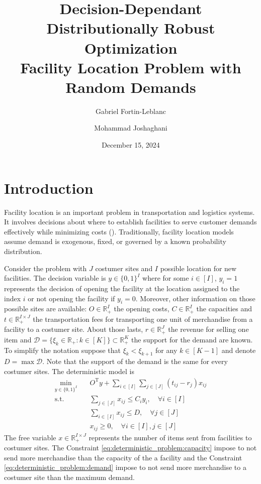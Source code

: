 \documentclass[12pt, letterpaper]{article}
\title{
	Decision-Dependant Distributionally Robust Optimization \\
	\large Facility Location Problem with Random Demands
}
\author[1]{Gabriel Fortin-Leblanc}
\author[2]{Mohammad Joshaghani}
\affil[1]{Université de Montréal}
\affil[2]{Université du Québec à Montréal}
\date{December 15, 2024}
\newcommand{\R}{\mathbb{R}}
\newcommand{\T}{\mathrm{T}}
\newcommand{\Dcal}{\mathcal{D}}
\begin{document}
	\maketitle
	\tableofcontents
	\newpage
	
	\section*{Introduction}
	Facility location is an important problem in transportation and logistics systems. It involves decisions about where to establish facilities to serve customer demands effectively while minimizing costs (\cite{cornuejols1983uncapicitated}). Traditionally, facility location models assume demand is exogenous, fixed, or governed by a known probability distribution.
	
	Consider the problem with $J$ costumer sites and $I$ possible location for new facilities. The decision variable is $y \in \{0, 1\}^I$ where for some $i \in [I]$, $y_i = 1$ represents the decision of opening the facility at the location assigned to the index $i$ or not opening the facility if $y_i = 0$. Moreover, other information on those possible sites are available: $O \in \R_+^I$ the opening costs, $C \in \R_+^I$ the capacities and $t \in \R_+^{I \times J}$ the transportation fees for transporting one unit of merchandise from a facility to a costumer site. About those lasts, $r \in \R_+^J$ the revenue for selling one item and $\Dcal = \{\xi_k \in \R_+: k \in [K]\} \subset \R_+^K$ the support for the demand are known. To simplify the notation suppose that $\xi_k < \xi_{k+1}$ for any $k \in [K-1]$ and denote $D = \max \Dcal$. Note that the support of the demand is the same for every costumer sites. The deterministic model is
	\begin{subequations} \label{eq:deterministic_problem}
		\begin{align}
			\min_{y \in \{0, 1\}^I} &\quad O^\T y + \sum_{i \in [I]} \sum_{j \in [J]} (t_{ij} - r_j) x_{ij} \\
			\text{s.t.} &\quad \sum_{j \in [J]} x_{ij} \le C_i y_i, \quad \forall i \in [I] \\ \label{eq:deterministic_problem:capacity}
			&\quad \sum_{i \in [I]} x_{ij} \le D, \quad \forall j \in [J] \\ \label{eq:deterministic_problem:demand}
			&\quad x_{ij} \ge 0, \quad \forall i \in [I], j \in [J]
		\end{align}
	\end{subequations}
	The free variable $x \in \R_+^{I \times J}$ represents the number of items sent from facilities to costumer sites. The Constraint \eqref{eq:deterministic_problem:capacity} impose to not send more merchandise than the capacity of the a facility and the Constraint \eqref{eq:deterministic_problem:demand} impose to not send more merchandise to a costumer site than the maximum demand.
	
\end{document}
